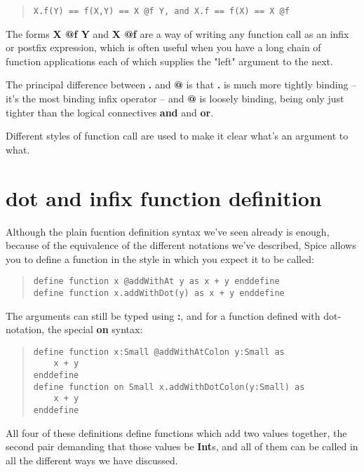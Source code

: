 \documentclass{report}
\begin{document}
\begin{quote}
\begin{verbatim}
X.f(Y) == f(X,Y) == X @f Y, and X.f == f(X) == X @f
\end{verbatim}
\end{quote}


The forms {\bf X @f Y} and {\bf X @f} are a way of writing any function call as an
infix or postfix expression, which is often useful when you have a long chain
of function applications each of which supplies the "left" argument to the
next.

The principal difference between {\bf .} and {\bf @} is that {\bf .} is much more tightly
binding -- it's the most binding infix operator -- and {\bf @} is loosely binding,
being only just tighter than the logical connectives {\bf and} and {\bf or}.

Different styles of function call are used to make it clear what's an argument to
what.

\section{dot and infix function definition}


Although the plain fucntion definition syntax we've seen already is enough,
because of the equivalence of the different notations we've described,
Spice allows you to define a function in the style in which you expect it
to be called:

\begin{quote}
\begin{verbatim}
define function x @addWithAt y as x + y enddefine
define function x.addWithDot(y) as x + y enddefine
\end{verbatim}
\end{quote}


The arguments can still be typed using {\bf :}, and for a function
defined with dot-notation, the special {\bf on} syntax:

\begin{quote}
\begin{verbatim}
define function x:Small @addWithAtColon y:Small as
    x + y
enddefine
define function on Small x.addWithDotColon(y:Small) as
    x + y
enddefine
\end{verbatim}
\end{quote}


All four of these definitions define functions which add two values together,
the second pair demanding that those values be {\bf Int}s, and all of them can be
called in all the different ways we have discussed.
\end{document}
